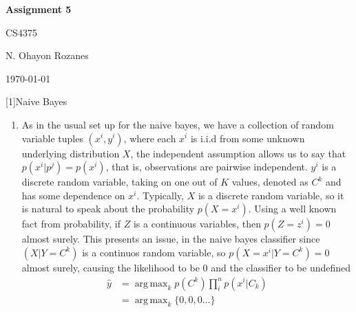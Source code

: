 \documentclass{article} %
\newcommand{\question}[2][]{
  \begin{flushleft}
    \textbf{Question #1}: \textit{#2}

\end{flushleft}}
\newcommand{\maketitletwo}[2][]{
  \begin{center}
    \Large{\textbf{Assignment #1}

    CS4375} %
    \vspace{5pt}

    \normalsize{N. Ohayon Rozanes  %

    \today}        %
    \vspace{15pt}

\end{center}}
\DeclareMathOperator*{\argmax}{arg\,max}
\begin{document}
\maketitletwo[5]  %

\question[1]{Naive Bayes}
\begin{enumerate}
  \item As in the usual set up for the naive bayes, we have a collection of
    random variable tuples $(x^i, y^i)$, where each $x^i$ is i.i.d from
    some unknown underlying distribution $X$, the independent assumption
    allows us to say that $p(x^i | p^j) = p(x^i)$, that is, observations
    are pairwise independent. $y^i$ is a discrete random variable,
    taking on one out of $K$ values, denoted as $C^k$ and has some
    dependence on $x^i$. Typically, $X$ is a discrete random variable, so
    it is natural to speak about the probability $p(X = x^i)$. Using a
    well known fact from probability, if $Z$ is a continuous variables,
    then $p(Z = z^i) = 0$ almost surely. This presents an issue, in the
    naive bayes classifier since $(X | Y = C^k)$ is a continuos
    random variable, so
    $p(X = x^i | Y = C^k) = 0$  almost surely, causing the likelihood to
    be $0$ and the classifier to be undefined
    \begin{align*}
      \hat y &= \argmax_{k} p(C^k)\prod_i^n p(x^i\vert C_k)\\
      &= \argmax_{k} \{0, 0 , 0 \hdots\} \\
    \end{align*}


\end{enumerate}
\end{document}
